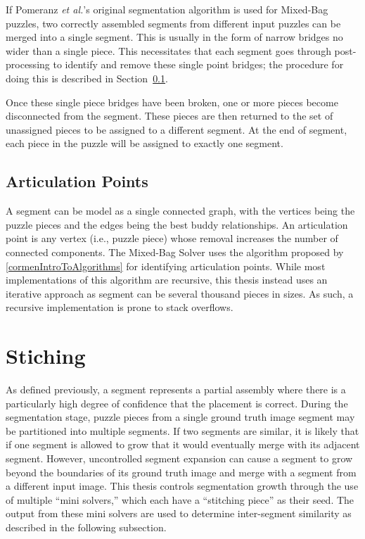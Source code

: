 If Pomeranz \textit{et al.}'s original segmentation algorithm is used for Mixed-Bag puzzles, two correctly assembled segments from different input puzzles can be merged into a single segment.  This is usually in the form of narrow bridges no wider than a single piece. This necessitates that each segment goes through post-processing to identify and remove these single point bridges; the procedure for doing this is described in Section~\ref{sec:ArticulationPoints}.  

Once these single piece bridges have been broken, one or more pieces become disconnected from the segment.  These pieces are then returned to the set of unassigned pieces to be assigned to a different segment.  At the end of segment, each piece in the puzzle will be assigned to exactly one segment.

\subsection{Articulation Points}\label{sec:ArticulationPoints}

A segment can be model as a single connected graph, with the vertices being the puzzle pieces and the edges being the best buddy relationships.  An articulation point is any vertex (i.e., puzzle piece) whose removal increases the number of connected components.  The Mixed-Bag Solver uses the algorithm proposed by \ref{cormenIntroToAlgorithms} for identifying articulation points.  While most implementations of this algorithm are recursive, this thesis instead uses an iterative approach as segment can be several thousand pieces in sizes.  As such, a recursive implementation is prone to stack overflows.

\section{Stiching}\label{sec:stitchingPieceSolving}

As defined previously, a segment represents a partial assembly where there is a particularly high degree of confidence that the placement is correct. During the segmentation stage, puzzle pieces from a single ground truth image segment may be partitioned into multiple segments. If two segments are similar, it is likely that if one segment is allowed to grow that it would eventually merge with its adjacent segment.  However, uncontrolled segment expansion can cause a segment to grow beyond the boundaries of its ground truth image and merge with a segment from a different input image.  This thesis controls segmentation growth through the use of multiple ``mini solvers,'' which each have a ``stitching piece'' as their seed.  The output from these mini solvers are used to determine inter-segment similarity as described in the following subsection.

